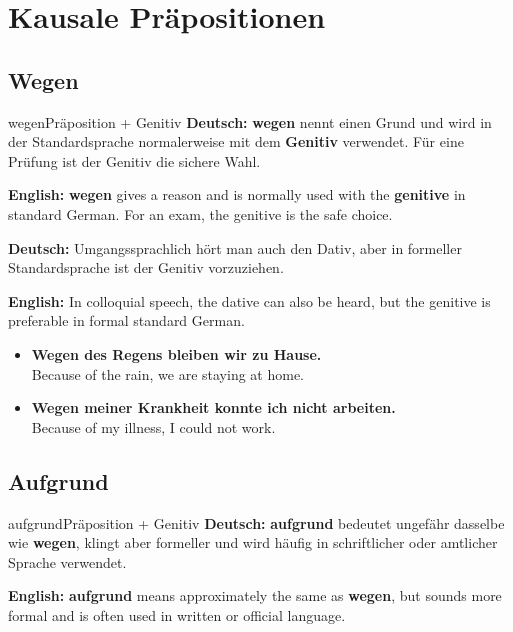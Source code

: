 \documentclass[a4paper,11pt]{article}
\newcommand{\GermanText}[1]{\textbf{Deutsch: }#1\par}
\newcommand{\EnglishText}[1]{{\small\color{SoftGray}\textbf{English: }#1\par}}
\newcommand{\ExampleItem}[2]{\item \textbf{#1}\\{\small\color{SoftGray}#2}}
\begin{document}
    \section{Kausale Präpositionen}

        \subsection{Wegen}

            \begin{grammarentry}{wegen}{Präposition + Genitiv}
                \GermanText{\textbf{wegen} nennt einen Grund und wird in der Standardsprache normalerweise mit dem \textbf{Genitiv} verwendet. Für eine Prüfung ist der Genitiv die sichere Wahl.}
                \EnglishText{\textbf{wegen} gives a reason and is normally used with the \textbf{genitive} in standard German. For an exam, the genitive is the safe choice.}

                \GermanText{Umgangssprachlich hört man auch den Dativ, aber in formeller Standardsprache ist der Genitiv vorzuziehen.}
                \EnglishText{In colloquial speech, the dative can also be heard, but the genitive is preferable in formal standard German.}
            \end{grammarentry}

            \begin{exbox}
                \begin{itemize}
                    \ExampleItem{Wegen des Regens bleiben wir zu Hause.}{Because of the rain, we are staying at home.}
                    \ExampleItem{Wegen meiner Krankheit konnte ich nicht arbeiten.}{Because of my illness, I could not work.}
                \end{itemize}
            \end{exbox}

        \subsection{Aufgrund}

            \begin{grammarentry}{aufgrund}{Präposition + Genitiv}
                \GermanText{\textbf{aufgrund} bedeutet ungefähr dasselbe wie \textbf{wegen}, klingt aber formeller und wird häufig in schriftlicher oder amtlicher Sprache verwendet.}
                \EnglishText{\textbf{aufgrund} means approximately the same as \textbf{wegen}, but sounds more formal and is often used in written or official language.}
            \end{grammarentry}
\end{document}
